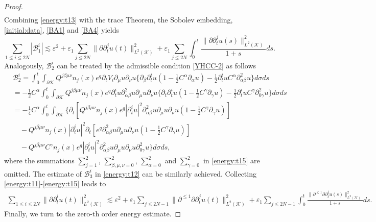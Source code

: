 \documentclass[11pt,twoside]{article}
\def\cB{\mathcal B}
\def\cK{\mathcal K}
\def\ds{\displaystyle}
\def\p{\partial}
\def\ve{\varepsilon}
\def\ls{\lesssim}
\theoremstyle{plain}
\theoremstyle{definition}
\numberwithin{equation}{section}
\begin{document}
\begin{proof}
\begin{equation}
\begin{split}
\end{split}
\end{equation}
Combining \eqref{energy:t13} with the trace Theorem, the Sobolev embedding, \eqref{initial:data}, \eqref{BA1}  and \eqref{BA4} yields
\begin{equation}\label{energy:t14}
\sum_{1\le i\le2N}|\cB_1^i|\ls\ve^2+\ve_1\sum_{j\le2N}\|\p\p_t^ju(t)\|^2_{L^2(\cK)}+\ve_1\sum_{j\le2N}\int_0^t\frac{\|\p\p_t^ju(s)\|^2_{L^2(\cK)}}{1+s}ds.
\end{equation}
Analogously, $\cB_2^i$ can be treated by the admissible condition \eqref{YHCC-2} as follows
\begin{equation}\label{energy:t15}
\begin{split}
&\cB_2^i=\int_0^t\int_{\p\cK}Q^{j\beta\mu\nu}n_j(x)e^q\p_tV_i\p_{\mu}u\p_{\nu}u
\Big\{\p_{\beta}\p_t^iu(1-\frac12C^{\alpha}\p_{\alpha}u)-\frac12\p_t^iuC^{\alpha}\p^2_{\alpha\beta}u\Big\}d\sigma ds\\
&=-\frac12C^{\alpha}\int_0^t\int_{\p\cK}Q^{j\beta\mu\nu}n_j(x)e^q\p_t^iu\p^2_{\alpha\beta}u\p_{\mu}u\p_{\nu}u
\Big\{\p_t\p_t^iu(1-\frac12C^{\gamma}\p_{\gamma}u)-\frac12\p_t^iuC^{\gamma}\p^2_{0\gamma}u\Big\}d\sigma ds\\
&=-\frac14C^{\alpha}\int_0^t\int_{\p\cK}\Big\{\p_t[Q^{j\beta\mu\nu}n_j(x)e^q|\p_t^iu|^2
\p^2_{\alpha\beta}u\p_{\mu}u\p_{\nu}u(1-\frac12C^{\gamma}\p_{\gamma}u)]\\
&\quad-Q^{j\beta\mu\nu}n_j(x)|\p_t^iu|^2\p_t[e^q\p^2_{\alpha\beta}u\p_{\mu}u\p_{\nu}u(1-\frac12C^{\gamma}\p_{\gamma}u)]\\
&\quad-Q^{j\beta\mu\nu}C^{\gamma}n_j(x)e^q|\p_t^iu|^2\p^2_{\alpha\beta}u\p_{\mu}u\p_{\nu}u\p^2_{0\gamma}u\Big\}d\sigma ds,
\end{split}
\end{equation}
where the summations $\ds\sum_{j=1}^2$, $\ds\sum_{\beta,\mu,\nu=0}^2$, $\ds\sum_{\alpha=0}^2$ and $\ds\sum_{\gamma=0}^2$
in \eqref{energy:t15} are omitted.
The estimate of $\cB_3^i$ in \eqref{energy:t12} can be similarly achieved.
Collecting \eqref{energy:t11}-\eqref{energy:t15} leads to
\begin{equation}\label{energy:t16}
\begin{split}
\sum_{1\le i\le2N}\|\p\p_t^iu(t)\|^2_{L^2(\cK)}
\ls\ve^2+\ve_1\sum_{j\le2N-1}\|\p^{\le1}\p\p_t^ju(t)\|^2_{L^2(\cK)}
+\ve_1\sum_{j\le2N-1}\int_0^t\frac{\|\p^{\le1}\p\p_t^ju(s)\|^2_{L^2(\cK)}}{1+s}ds.
\end{split}
\end{equation}
Finally, we turn to the zero-th order energy estimate.

\end{proof}
\end{document}
